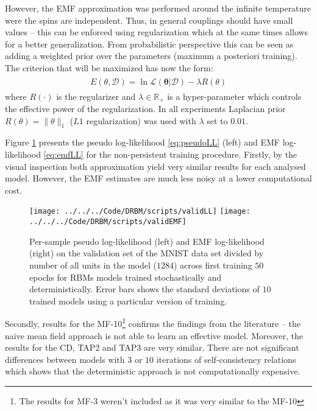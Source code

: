 However, the EMF approximation was performed around the infinite temperature were the spins are independent. Thus, in general couplings should have small values -- this can be enforced using regularization which at the same times allows for a better generalization. From probabilistic perspective this can be seen as adding a weighted prior over the parameters (maximum a posteriori training). The criterion that will be maximized has now the form:
\begin{align}
\begin{split}
E(\theta, \mathcal{D}) = \ln \mathcal{L}(\mathbf{\theta}| \mathcal{D}) - \lambda R(\theta)
\end{split}
\end{align}
where $R(\cdot)$ is the regularizer and $\lambda \in \mathbb{R}_+$ is a hyper-parameter which controls the effective power of the regularization.
In all experiments Laplacian prior $R(\theta) = \| \theta \|_1$ ($L1$ regularization) was used with $\lambda$ set to $0.01$. 

Figure \ref{fig:validLL} presents the pseudo log-likelihood \ref{eq:pseudoLL} (left) and EMF log-likelihood \ref{eq:emfLL} for the non-persistent training procedure. Firstly, by the visual inspection both approximation yield very similar results for each analysed model. However, the EMF estimates are much less noisy at a lower computational cost.

\begin{figure}[!htb]
%
 \texttt{[image: ../../../Code/DRBM/scripts/validLL]}
\endminipage 
{}  
 \texttt{[image: ../../../Code/DRBM/scripts/validEMF]}
\endminipage\hfill
  \caption[Comparison of log-likelihood estimates]{Per-sample pseudo log-likelihood (left) and EMF log-likelihood (right) on the validation set of the MNIST data set divided by number of all units in the model ($1284$) across first training $50$ epochs for RBMs models trained stochastically and deterministically. Error bars shows the standard deviations of $10$ trained models using a particular version of training.}
   \label{fig:validLL}
\end{figure}
Secondly, results for the MF-10\footnote{The results for MF-3 weren't included as it was very similar to the MF-10} confirms the findings from the literature -- the naive mean field approach is not able to learn an effective model. Moreover, the results for the CD, TAP2 and TAP3 are very similar. There are not significant differences between models with $3$ or $10$ iterations of self-consistency relations which shows that the deterministic approach is not computationally expensive. 

